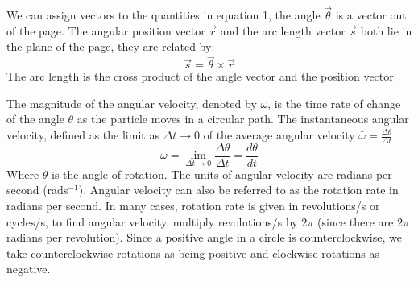 \documentclass[a4paper]{article}
\begin{document}
\noindent We can assign vectors to the quantities in equation 1, the angle $\vec{\theta}$ is a vector out of the page. The angular position vector $\vec{r}$ and the arc length vector $\vec{s}$ both lie in the plane of the page, they are related by:
\begin{equation}
    \vec{s} = \vec{\theta} \times \vec{r}
\end{equation}
The arc length is the cross product of the angle vector and the position vector
\begin{center}
\end{center}
The magnitude of the angular velocity, denoted by $\omega$, is the time rate of change of the angle $\theta$ as the particle moves in a circular path. The instantaneous angular velocity, defined as the limit as $\Delta t \to 0$ of the average angular velocity $\bar{\omega} = \frac{\Delta\theta}{\Delta t}$
\begin{equation}
    \omega = \lim\limits_{\Delta t \to 0}\frac{\Delta\theta}{\Delta t} = \frac{d\theta}{dt}
\end{equation}
Where $\theta$ is the angle of rotation. The units of angular velocity are radians per second (rad\;s$^{-1}$). Angular velocity can also be referred to as the rotation rate in radians per second. In many cases, rotation rate is given in revolutions/s or cycles/s, to find angular velocity, multiply revolutions/s by $2\pi$ (since there are $2\pi$ radians per revolution). Since a positive angle in a circle is counterclockwise, we take counterclockwise rotations as being positive and clockwise rotations as negative.
\end{document}

